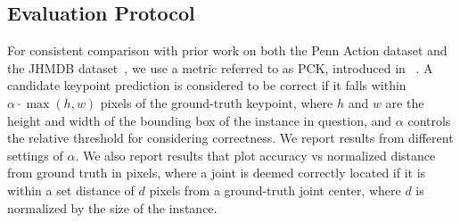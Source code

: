 \documentclass[10pt,twocolumn,letterpaper]{article}
\begin{document}
\subsection{Evaluation Protocol}
For consistent comparison with prior work on both the Penn Action dataset and the JHMDB dataset~\cite{gkioxari2016chained,xiaohan2015joint,park2011n}, we use a metric referred to as PCK, introduced in ~\cite{yang2011articulated}. A candidate keypoint prediction is considered to be correct if it falls within $\alpha \cdot \max(h, w)$ pixels of the
ground-truth keypoint, where $h$ and $w$ are the height
and width of the bounding box of the instance in question, and $\alpha$ controls the relative threshold for considering correctness. We report results from different settings of $\alpha$.
We also report results that plot accuracy vs normalized distance from ground truth in pixels, where a joint is deemed correctly located if it is within a set distance
of $d$ pixels from a ground-truth joint center, where $d$ is normalized by the size of the instance.
\begin{table}[t]
\begin{center}
\end{center}
\caption{Comparison of PCK@0.2 on Penn Action dataset. We compare our proposed model with baseline model, baseline model with spatial inference and other state-of-the-art methods. We also investigate the performance of independent training ($\star$), the baseline ConvNet after end-to-end training ($\ast$) and temporal connection across 2 frames ($2$). }
\label{table:Penn}
\end{table}%
\end{document}
